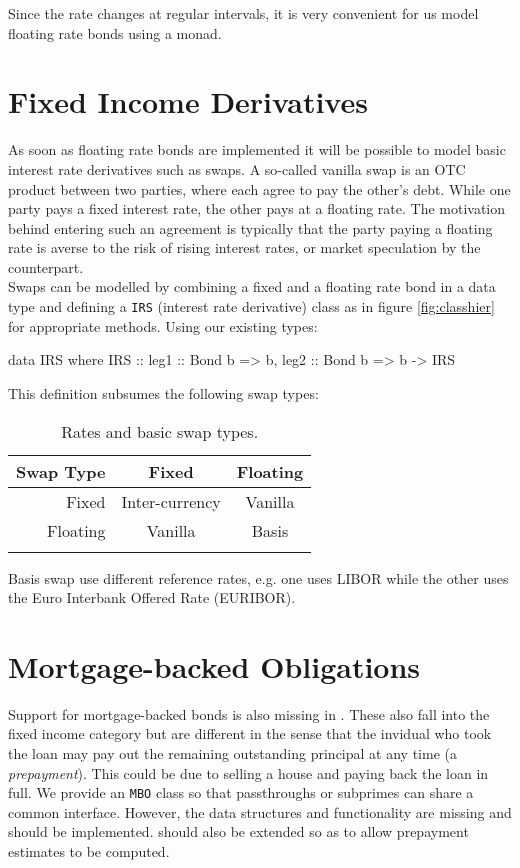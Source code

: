 Since the rate changes at regular intervals, it is very convenient for us
model floating rate bonds using a monad. 

\section{Fixed Income Derivatives}

As soon as floating rate bonds are implemented it will be possible to model
basic interest rate derivatives such as swaps. A so-called vanilla swap is an
OTC product between two parties, where each agree to pay the other's debt. While
one party pays a fixed interest rate, the other pays at a floating rate. The
motivation behind entering such an agreement is typically that the party paying
a floating rate is averse to the risk of rising interest rates, or market
speculation by the counterpart.\\

Swaps can be modelled by combining a fixed and a floating rate bond in a data
type and defining a \texttt{IRS} (interest rate derivative) class as in figure
\ref{fig:classhier} for appropriate methods.
Using our existing types:

\begin{hscode}
data IRS where
    IRS :: { leg1 :: Bond b => b,
             leg2 :: Bond b => b } -> IRS
\end{hscode}

This definition subsumes the following swap types:

\begin{center}  
\begin{longtable}{r|c|c|}
Swap Type & Fixed          & Floating \\\hline  
Fixed     & Inter-currency & Vanilla\\\hline
Floating  & Vanilla        & Basis\\\hline
\caption{Rates and basic swap types.}
\end{longtable}
\label{tab:swaps}
\end{center}

Basis swap use different reference rates, e.g. one uses LIBOR while the other
uses the Euro Interbank Offered Rate (EURIBOR)\cite{HULL}.

\section{Mortgage-backed Obligations}

Support for mortgage-backed bonds is also missing in \hql. These also fall
into the fixed income category but are different in the sense that the
invidual who took the loan may pay out the remaining outstanding principal
at any time (a \emph{prepayment}). This could be due to selling a house 
and paying back the loan in full. 
We provide an \texttt{MBO} class so that passthroughs or subprimes can share a 
common interface. However, the data structures and functionality are missing 
and should be  implemented. \hql should also be extended so as to allow 
prepayment estimates to be computed.

